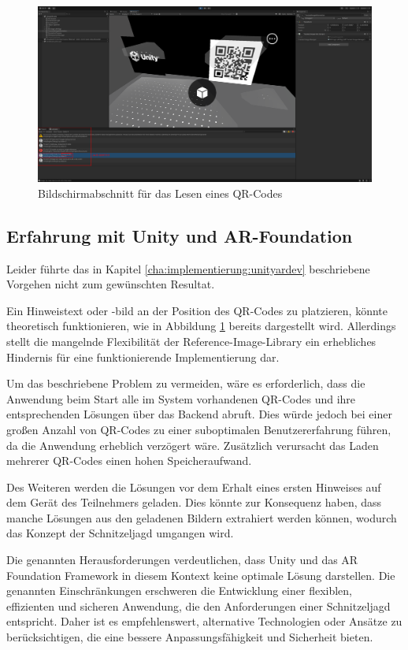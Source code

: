 \begin{figure}[H]
    \centering
    \includegraphics[width=\textwidth]{images/PrAr_UnityAR-Read-Qr-Img.png}
    \caption{Bildschirmabschnitt für das Lesen eines QR-Codes}
    \label{fig:implementierung:unity:AR-Read-Qr-Img}
\end{figure}

\subsection{Erfahrung mit Unity und AR-Foundation}

Leider führte das in Kapitel \ref{cha:implementierung:unityardev} beschriebene Vorgehen nicht zum gewünschten Resultat.

Ein Hinweistext oder -bild an der Position des QR-Codes zu platzieren, könnte theoretisch funktionieren, wie in Abbildung \ref{fig:implementierung:unity:AR-Read-Qr-Img} bereits dargestellt wird. Allerdings stellt die mangelnde Flexibilität der Reference-Image-Library ein erhebliches Hindernis für eine funktionierende Implementierung dar.

Um das beschriebene Problem zu vermeiden, wäre es erforderlich, dass die Anwendung beim Start alle im System vorhandenen QR-Codes und ihre entsprechenden Lösungen über das Backend abruft. Dies würde jedoch bei einer großen Anzahl von QR-Codes zu einer suboptimalen Benutzererfahrung führen, da die Anwendung erheblich verzögert wäre. Zusätzlich verursacht das Laden mehrerer QR-Codes einen hohen Speicheraufwand.

Des Weiteren werden die Lösungen vor dem Erhalt eines ersten Hinweises auf dem Gerät des Teilnehmers geladen. Dies könnte zur Konsequenz haben, dass manche Lösungen aus den geladenen Bildern extrahiert werden können, wodurch das Konzept der Schnitzeljagd umgangen wird.

Die genannten Herausforderungen verdeutlichen, dass Unity und das AR Foundation Framework in diesem Kontext keine optimale Lösung darstellen. Die genannten Einschränkungen erschweren die Entwicklung einer flexiblen, effizienten und sicheren Anwendung, die den Anforderungen einer Schnitzeljagd entspricht. Daher ist es empfehlenswert, alternative Technologien oder Ansätze zu berücksichtigen, die eine bessere Anpassungsfähigkeit und Sicherheit bieten.

